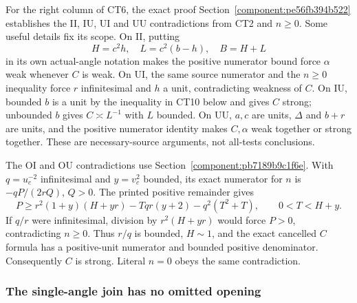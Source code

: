 For the right column of CT6, the exact proof
Section~\ref{component:pe56fb394b522} establishes the II, IU, UI and UU
contradictions from CT2 and \(n\geq0\).
Some useful details fix its scope.  On II, putting
\[
 H=c^2h,\quad L=c^2(b-h),\quad B=H+L
\]
in its own actual-angle notation makes the positive numerator
bound force \(\alpha\) weak whenever \(C\) is weak.  On UI, the
same source numerator and the \(n\geq0\) inequality force
\(r\) infinitesimal and \(h\) a unit, contradicting weakness
of \(C\).  On IU, bounded \(b\) is a unit by the inequality in
CT10 below and gives \(C\) strong; unbounded \(b\) gives
\(C\asymp L^{-1}\) with \(L\) bounded.  On UU, \(a,c\) are units,
\(\Delta\) and \(b+r\) are units, and the positive numerator
identity makes \(C,\alpha\) weak together or strong together.
These are necessary-source arguments, not all-tests conclusions.

The OI and OU contradictions use
Section~\ref{component:pb7189b9c1f6e}.
With \(q=u_c^{-2}\) infinitesimal and \(y=v_c^2\) bounded, its
exact numerator for \(n\) is \(-qP/(2rQ)\), \(Q>0\).
The printed positive remainder gives
\[
 P\geq r^2(1+y)(H+yr)-Tqr(y+2)-q^2(T^2+T),\qquad
 0<T<H+y .
\]
If \(q/r\) were infinitesimal, division by \(r^2(H+yr)\)
would force \(P>0\), contradicting \(n\geq0\).
Thus \(r/q\) is bounded, \(H\sim1\), and the exact cancelled
\(C\) formula has a positive-unit numerator and bounded
positive denominator.  Consequently \(C\) is strong.  Literal
\(n=0\) obeys the same contradiction.

\subsubsection*{The single-angle join has no omitted opening}

